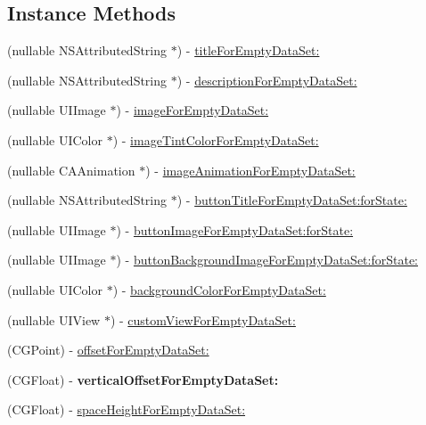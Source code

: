 \subsection*{Instance Methods}
\begin{DoxyCompactItemize}
\item 
(nullable N\+S\+Attributed\+String $\ast$) -\/ \mbox{\hyperlink{protocol_d_z_n_empty_data_set_source_01-p_a90d3eb4ef397bbd2f407efe1c4e4136f}{title\+For\+Empty\+Data\+Set\+:}}
\item 
(nullable N\+S\+Attributed\+String $\ast$) -\/ \mbox{\hyperlink{protocol_d_z_n_empty_data_set_source_01-p_a50ef161cf4d911ea5f85a3bdaa8ac714}{description\+For\+Empty\+Data\+Set\+:}}
\item 
(nullable U\+I\+Image $\ast$) -\/ \mbox{\hyperlink{protocol_d_z_n_empty_data_set_source_01-p_a68909f5e8562ff7b941f0141fcb9be31}{image\+For\+Empty\+Data\+Set\+:}}
\item 
(nullable U\+I\+Color $\ast$) -\/ \mbox{\hyperlink{protocol_d_z_n_empty_data_set_source_01-p_a2689805f9cd2ce77d7a48da96e8e59f0}{image\+Tint\+Color\+For\+Empty\+Data\+Set\+:}}
\item 
(nullable C\+A\+Animation $\ast$) -\/ \mbox{\hyperlink{protocol_d_z_n_empty_data_set_source_01-p_a2af10188f09fbac8ce42eb40554d78fc}{image\+Animation\+For\+Empty\+Data\+Set\+:}}
\item 
(nullable N\+S\+Attributed\+String $\ast$) -\/ \mbox{\hyperlink{protocol_d_z_n_empty_data_set_source_01-p_ac7afc4579b4c917f060e87effd5485ee}{button\+Title\+For\+Empty\+Data\+Set\+:for\+State\+:}}
\item 
(nullable U\+I\+Image $\ast$) -\/ \mbox{\hyperlink{protocol_d_z_n_empty_data_set_source_01-p_aa1d924cc39186a1c5283e2cb2df64fb0}{button\+Image\+For\+Empty\+Data\+Set\+:for\+State\+:}}
\item 
(nullable U\+I\+Image $\ast$) -\/ \mbox{\hyperlink{protocol_d_z_n_empty_data_set_source_01-p_ab68e6128a6179741e05f63233c859ba9}{button\+Background\+Image\+For\+Empty\+Data\+Set\+:for\+State\+:}}
\item 
(nullable U\+I\+Color $\ast$) -\/ \mbox{\hyperlink{protocol_d_z_n_empty_data_set_source_01-p_a8ae5fff49c59b843c3daee5116827b8d}{background\+Color\+For\+Empty\+Data\+Set\+:}}
\item 
(nullable U\+I\+View $\ast$) -\/ \mbox{\hyperlink{protocol_d_z_n_empty_data_set_source_01-p_a0af329a457d227385ec1776b0e11eedb}{custom\+View\+For\+Empty\+Data\+Set\+:}}
\item 
(C\+G\+Point) -\/ \mbox{\hyperlink{protocol_d_z_n_empty_data_set_source_01-p_ae8197d4b28e5596733af8742eaa138d5}{offset\+For\+Empty\+Data\+Set\+:}}
\item 
\mbox{\label{protocol_d_z_n_empty_data_set_source_01-p_a318b93d6fc55680d5edf18153c4eded9}} 
(C\+G\+Float) -\/ {\bfseries vertical\+Offset\+For\+Empty\+Data\+Set\+:}
\item 
(C\+G\+Float) -\/ \mbox{\hyperlink{protocol_d_z_n_empty_data_set_source_01-p_a42f883a1104a351ee8b83e536d5c70a0}{space\+Height\+For\+Empty\+Data\+Set\+:}}
\end{DoxyCompactItemize}


